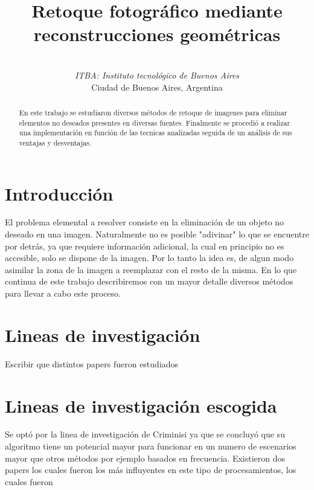 \documentclass[conference]{IEEEtran}
\begin{document}
\title{Retoque fotográfico mediante reconstrucciones geométricas}
\author{
 \\
\textit{ITBA: Instituto tecnológico de Buenos Aires}\\
Ciudad de Buenos Aires, Argentina
}
\maketitle

\begin{abstract}
En este trabajo se estudiaron
 diversos métodos de retoque de imagenes para eliminar elementos no deseados presentes en diversas fuentes. Finalmente se procedió a realizar una implementación en función de las tecnicas analizadas seguida de un análisis de sus ventajas y desventajas.
\end{abstract}

\section{Introducción}
El problema elemental a resolver consiste en la eliminación de un objeto no deseado en una imagen.
Naturalmente no es posible "adivinar" lo que se encuentre por detrás, ya que requiere información adicional, la cual en principio no es accesible, solo se dispone de la imagen. Por lo tanto la idea es, de algun modo asimilar la zona de la imagen a reemplazar con el resto de la misma. En lo que continua de este trabajo describiremos con un mayor detalle diversos métodos para llevar a cabo este proceso.

\section{Lineas de investigación}
Escribir que distintos papers fueron estudiados

\section{Lineas de investigación escogida}
Se optó por la linea de investigación de Criminisi ya que se concluyó que su algoritmo tiene un potencial mayor para funcionar en un numero de escenarios mayor que otros métodos por ejemplo basados en frecuencia. Existieron dos papers los cuales fueron los más influyentes en este tipo de procesamientos, los cuales fueron 
\end{document}
